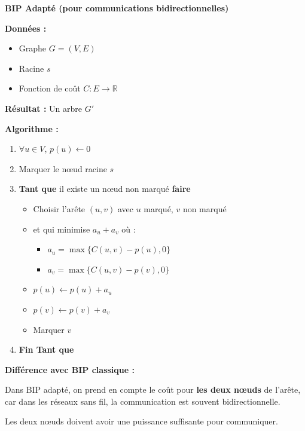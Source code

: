 \documentclass[12pt,a4paper]{article}
\begin{document}
\begin{algorithme}
\textbf{BIP Adapté (pour communications bidirectionnelles)}

\textbf{Données :} 
\begin{itemize}
    \item Graphe $G = (V, E)$
    \item Racine $s$
    \item Fonction de coût $C : E \to \mathbb{R}$
\end{itemize}

\textbf{Résultat :} Un arbre $G'$

\textbf{Algorithme :}
\begin{enumerate}
    \item $\forall u \in V$, $p(u) \leftarrow 0$
    \item Marquer le nœud racine $s$
    \item \textbf{Tant que} il existe un nœud non marqué \textbf{faire}
    \begin{itemize}
        \item Choisir l'arête $(u, v)$ avec $u$ marqué, $v$ non marqué
        \item et qui minimise $a_u + a_v$ où :
        \begin{itemize}
            \item $a_u = \max\{C(u, v) - p(u), 0\}$
            \item $a_v = \max\{C(u, v) - p(v), 0\}$
        \end{itemize}
        \item $p(u) \leftarrow p(u) + a_u$
        \item $p(v) \leftarrow p(v) + a_v$
        \item Marquer $v$
    \end{itemize}
    \item \textbf{Fin Tant que}
\end{enumerate}
\end{algorithme}

\begin{notecours}
\textbf{Différence avec BIP classique :}

Dans BIP adapté, on prend en compte le coût pour \textcolor{titrebleu}{\textbf{les deux nœuds}} de l'arête, car dans les réseaux sans fil, la communication est souvent bidirectionnelle.

Les deux nœuds doivent avoir une puissance suffisante pour communiquer.
\end{notecours}
\end{document}
